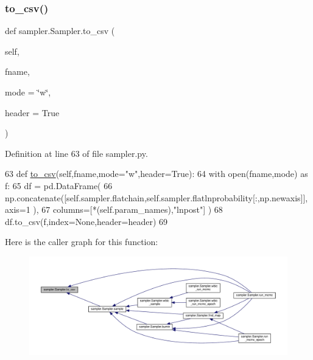 \subsubsection{\texorpdfstring{to\+\_\+csv()}{to\_csv()}}
{\footnotesize\ttfamily def sampler.\+Sampler.\+to\+\_\+csv (\begin{DoxyParamCaption}\item[{}]{self,  }\item[{}]{fname,  }\item[{}]{mode = {\ttfamily \char`\"{}w\char`\"{}},  }\item[{}]{header = {\ttfamily True} }\end{DoxyParamCaption})}



Definition at line 63 of file sampler.\+py.


\begin{DoxyCode}
63     \textcolor{keyword}{def }\hyperlink{classsampler_1_1Sampler_a57168d6c5801b89109e2a2cd7d7ff4ce}{to\_csv}(self,fname,mode="w",header=True):
64         with open(fname,mode) \textcolor{keyword}{as} f:
65             df = pd.DataFrame(
66                 np.concatenate([self.sampler.flatchain,self.sampler.flatlnprobability[:,np.newaxis]],axis=1
      ),
67                 columns=[*(self.param\_names),\textcolor{stringliteral}{"lnpost"}] )
68             df.to\_csv(f,index=\textcolor{keywordtype}{None},header=header)
69             
\end{DoxyCode}
Here is the caller graph for this function\+:\nopagebreak
\begin{figure}[H]
\begin{center}
\leavevmode
\includegraphics[width=350pt]{d3/d8a/classsampler_1_1Sampler_a57168d6c5801b89109e2a2cd7d7ff4ce_icgraph}
\end{center}
\end{figure}
\mbox{\label{classsampler_1_1Sampler_a4e540da7daf591f96268bd3090018679}} 
